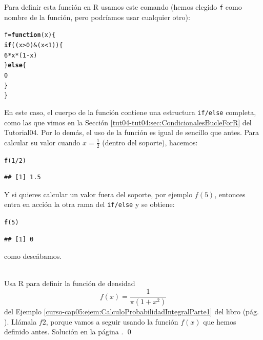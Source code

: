 \documentclass[10pt,a4paper]{article}\usepackage[]{graphicx}\usepackage[]{color}
\makeatletter
\newcommand{\hlnum}[1]{\textcolor[rgb]{0.686,0.059,0.569}{#1}}%
\newcommand{\hlopt}[1]{\textcolor[rgb]{0,0,0}{#1}}%
\newcommand{\hlstd}[1]{\textcolor[rgb]{0.345,0.345,0.345}{#1}}%
\newcommand{\hlkwa}[1]{\textcolor[rgb]{0.161,0.373,0.58}{\textbf{#1}}}%
\newcommand{\hlkwb}[1]{\textcolor[rgb]{0.69,0.353,0.396}{#1}}%
\newcommand{\hlkwc}[1]{\textcolor[rgb]{0.333,0.667,0.333}{#1}}%
\newcommand{\hlkwd}[1]{\textcolor[rgb]{0.737,0.353,0.396}{\textbf{#1}}}%
\newenvironment{kframe}{%
 \def\at@end@of@kframe{}%
 \ifinner\ifhmode%
  \def\at@end@of@kframe{\end{minipage}}%
  \begin{minipage}{\columnwidth}%
 \fi\fi%
 \def\FrameCommand##1{\hskip\@totalleftmargin \hskip-\fboxsep
 \colorbox{shadecolor}{##1}\hskip-\fboxsep
     \hskip-\linewidth \hskip-\@totalleftmargin \hskip\columnwidth}%
 \MakeFramed {\advance\hsize-\width
   \@totalleftmargin\z@ \linewidth\hsize
   \@setminipage}}%
 {\par\unskip\endMakeFramed%
 \at@end@of@kframe}
\newenvironment{knitrout}{}{} %
\newcounter{cont01}
\makeatother
\begin{document}
Para definir esta función en R usamos este comando (hemos elegido {\tt f} como nombre de la función, pero podríamos usar cualquier otro):
\begin{knitrout}
\color{fgcolor}\begin{kframe}
\begin{alltt}
\hlstd{f} \hlkwb{=} \hlkwa{function}\hlstd{(}\hlkwc{x}\hlstd{)\{}
    \hlkwa{if}\hlstd{((x}\hlopt{>}\hlnum{0}\hlstd{)} \hlopt{&} \hlstd{(x}\hlopt{<}\hlnum{1}\hlstd{))\{}
        \hlnum{6} \hlopt{*} \hlstd{x} \hlopt{*} \hlstd{(}\hlnum{1} \hlopt{-} \hlstd{x)}
    \hlstd{\}} \hlkwa{else} \hlstd{\{}
        \hlnum{0}
    \hlstd{\}}
\hlstd{\}}
\end{alltt}
\end{kframe}
\end{knitrout}
En este caso, el cuerpo de la función contiene una estructura {\tt if/else} completa, como las que vimos en la Sección \ref{tut04-tut04:sec:CondicionalesBucleForR} del Tutorial04. Por lo demás, el uso de la función es igual de sencillo que antes. Para calcular su valor cuando $x=\frac{1}{2}$ (dentro del soporte), hacemos:
\begin{knitrout}
\color{fgcolor}\begin{kframe}
\begin{alltt}
\hlkwd{f}\hlstd{(}\hlnum{1}\hlopt{/}\hlnum{2}\hlstd{)}
\end{alltt}
\begin{verbatim}
## [1] 1.5
\end{verbatim}
\end{kframe}
\end{knitrout}
Y si quieres calcular un valor fuera del soporte, por ejemplo $f(5)$, entonces entra en acción la otra rama del {\tt if/else} y se obtiene:
\begin{knitrout}
\color{fgcolor}\begin{kframe}
\begin{alltt}
\hlkwd{f}\hlstd{(}\hlnum{5}\hlstd{)}
\end{alltt}
\begin{verbatim}
## [1] 0
\end{verbatim}
\end{kframe}
\end{knitrout}
como deseábamos.

\begin{ejercicio}
\label{tut05:ejercicio25}
\quad\\
Usa R para definir la función de densidad
\[f(x)=\dfrac{1}{\pi(1+x^2)}\]
del Ejemplo \ref{curso-cap05:ejem:CalculoProbabilidadIntegralParte1} del libro (pág.
\pageref{curso-cap05:ejem:CalculoProbabilidadIntegralParte1}). Llámala $f2$, porque vamos a seguir usando la función $f(x)$ que hemos definido antes.
Solución en la página \pageref{tut05:ejercicio25:sol}.
\qed
\end{ejercicio}
\end{document}

